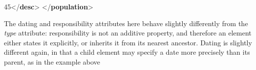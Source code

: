 \begin{shaded}
\hspace*{1em}\mbox{}\newline 
\hspace*{1em}\hspace*{1em}45{</\textbf{desc}>}\mbox{}\newline 
\hspace*{1em}\mbox{}\newline 
{}\mbox{}\newline 
{</\textbf{population}>}\end{shaded}\egroup\par \noindent  The dating and responsibility attributes here behave slightly differently from the {\itshape type} attribute: responsibility is not an additive property, and therefore an element either states it explicitly, or inherits it from its nearest ancestor. Dating is slightly different again, in that a child element may specify a date more precisely than its parent, as in the example above\par
